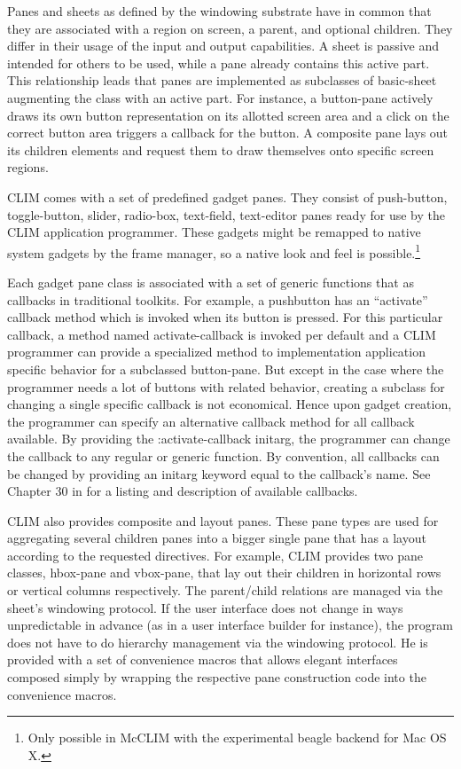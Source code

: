 \documentclass[twocolumn,a4paper]{article}
\newcommand {\code}[1]{{\sffamily #1}}
\newcommand {\CLIM}{{\small CLIM}}
\let\class\code
\let\method\code
\let\keyword\code
\begin{document}
Panes and sheets as defined by the windowing substrate have in common that they are associated with a region on screen, a parent, and optional children. They differ in their usage of the input and output capabilities. A sheet is passive and intended for others to be used, while a pane already contains this active part. This relationship leads that panes are implemented as subclasses of \class{basic-sheet} augmenting the class with an active part. For instance, a button-pane actively draws its own button representation on its allotted screen area and a click on the correct button area triggers a callback for the button. A composite pane lays out its children elements and request them to draw themselves onto specific screen regions. 

\CLIM{} comes with a set of predefined gadget panes. They consist of push-button, toggle-button, slider, radio-box, text-field, text-editor panes ready for use by the \CLIM{} application programmer. These gadgets might be remapped to native system gadgets by the frame manager, so a native look and feel is possible.\footnote{Only possible in McCLIM with the experimental beagle backend for Mac OS X.}

Each gadget pane class is associated with a set of generic functions that as callbacks in traditional toolkits. For example, a pushbutton has an ``activate'' callback method which is invoked when its button is pressed. For this particular callback, a method named \method{activate-callback} is invoked per default and a \CLIM{} programmer can provide a specialized method to implementation application specific behavior for a subclassed button-pane. But except in the case where the programmer needs a lot of buttons with related behavior, creating a subclass for changing a single specific callback is not economical. Hence upon gadget creation, the programmer can specify an alternative callback method for all callback available. By providing the \keyword{:activate-callback} initarg, the programmer can change the callback to any regular or generic function. By convention, all callbacks can be changed by providing an initarg keyword equal to the callback's name. See Chapter 30 in \cite{clim-spec} for a listing and description of available callbacks.

\CLIM{} also provides composite and layout panes. These pane types are used for aggregating several children panes into a bigger single pane that has a layout according to the requested directives.  For example, \CLIM{} provides two pane classes, \class{hbox-pane} and \class{vbox-pane}, that lay out their children in horizontal rows or vertical columns respectively. The parent/child relations are managed via the sheet's windowing protocol. If the user interface does not change in ways unpredictable in advance (as in a user interface builder for instance), the program does not have to do hierarchy management via the windowing protocol. He is provided with a set of convenience macros that allows elegant interfaces composed simply by wrapping the respective pane construction code into the convenience macros.
\end{document}
